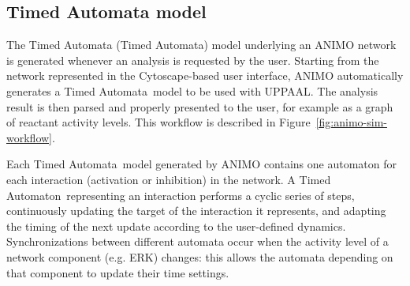 \documentclass{bmcart}
\def\ta{Timed Automaton}
\def\tas{Timed Automata}
\begin{document}
%
%
%
%




\subsection{Timed Automata model}
The Timed Automata (\tas) model underlying an ANIMO network is generated whenever an analysis is requested by the user.
Starting from the network represented in the Cytoscape-based user interface, ANIMO automatically generates a \tas\ model
to be used with UPPAAL. The analysis result is then parsed and properly presented to the user, for example
as a graph of reactant activity levels. This workflow is described in Figure~\ref{fig:animo-sim-workflow}.


Each \tas\ model generated by ANIMO contains one automaton for each interaction (activation or inhibition) in the network.
A \ta\ representing an interaction performs a cyclic series of steps, continuously updating
the target of the interaction it represents, and adapting the timing of the next update according to
the user-defined dynamics. Synchronizations between different automata occur when the activity level of a network component (e.g. ERK)
changes: this allows the automata depending on that component to update their time settings.
\end{document}
